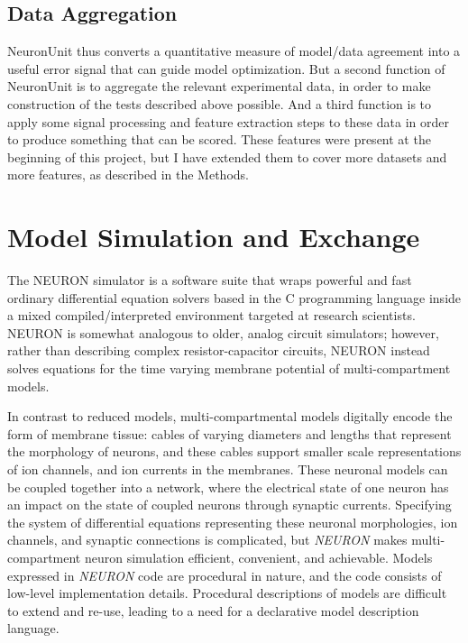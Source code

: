 \subsection{Data Aggregation}
NeuronUnit thus converts a quantitative measure of model/data agreement into a useful error signal that can guide model optimization.
But a second function of NeuronUnit is to aggregate the relevant experimental data, in order to make  construction of the tests described above possible.
And a third function is to apply some signal processing and feature extraction steps to these data in order to produce something that can be scored.
These features were present at the beginning of this project, but I have extended them to cover more datasets and more features, as described in the Methods.

\section{Model Simulation and Exchange}
The NEURON \cite{carnevale2006neuron} simulator is a software suite that wraps powerful and fast ordinary differential equation solvers based in the C programming language inside a mixed compiled/interpreted environment targeted at research scientists. NEURON is somewhat analogous to older, analog circuit simulators;
however, rather than describing complex resistor-capacitor circuits, NEURON instead solves equations for the time varying membrane potential of multi-compartment models.

In contrast to reduced models, multi-compartmental models digitally encode the form of membrane tissue: cables of varying diameters and lengths that represent the morphology of neurons, and these cables support smaller scale representations of ion channels, and ion currents in the membranes.
These neuronal models can be coupled together into a network, where the electrical state of one neuron has an impact on the state of coupled neurons through synaptic currents.
Specifying the system of differential equations representing these neuronal morphologies, ion channels, and synaptic connections is complicated, but \emph{NEURON} makes multi-compartment neuron simulation efficient, convenient, and achievable.
Models expressed in \emph{NEURON} code are procedural in nature, and the code consists of low-level implementation details.
Procedural descriptions of models are difficult to extend and re-use, leading to a need for a declarative model description language.

